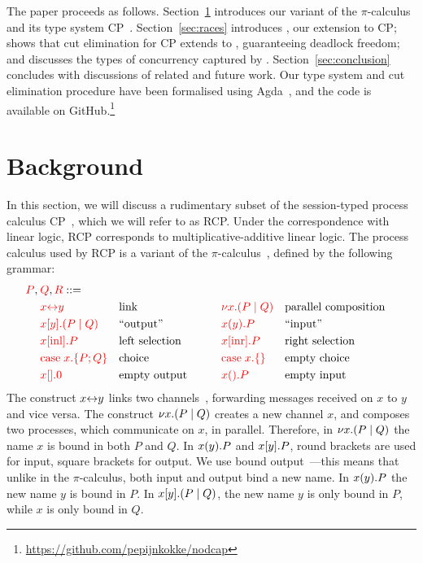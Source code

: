 \documentclass[a4paper,UKenglish]{lipics-v2016}
\begin{document}
The paper proceeds as follows.  Section~\ref{sec:background} introduces our
variant of the $\pi$-calculus and its type system CP~\cite{wadler2012}.
Section~\ref{sec:races} introduces \nodcap, our extension to CP; shows that cut
elimination for CP extends to \nodcap, guaranteeing deadlock freedom; and
discusses the types of concurrency captured by \nodcap.
Section~\ref{sec:conclusion} concludes with discussions of related and future work.
%
Our type system and cut elimination procedure
have been formalised using Agda~\cite{norell2009}, and the code is
available on GitHub.\footnote{%
  \url{https://github.com/pepijnkokke/nodcap}
}

\section{Background}
\label{sec:background}

In this section, we will discuss a rudimentary subset of the session-typed
process calculus CP~\cite{wadler2012}, which we will refer to as RCP.
Under the correspondence with linear logic, RCP corresponds to
multiplicative-additive linear logic.
The process calculus used by RCP is a variant of the
$\pi$-calculus~\cite{milner1992b}, defined by
the following grammar:
\[
  \begin{aligned}
    \red{P},\:&\red{Q},\red{R} ::=\\
    &       \red{\link{x}{y}}           &&\text{link}
    &\qquad&\red{\cut{x}(P \mid Q)}     &&\text{parallel composition}\\
    &       \red{\send{x}{y}(P \mid Q)} &&\text{``output''}
    &\qquad&\red{\recv{x}{y}P}          &&\text{``input''}\\
    &       \red{\inl{x}P}              &&\text{left selection}
    &\qquad&\red{\inr{x}P}              &&\text{right selection}\\
    &       \red{\case{x}{P}{Q}}        &&\text{choice}
    &\qquad&\red{\case{x}{}{}}          &&\text{empty choice}\\
    &       \red{\send{x}{}0}           &&\text{empty output}
    &\qquad&\red{\recv{x}{}P}           &&\text{empty input}\\
  \end{aligned}
\]
The construct ${x{\leftrightarrow}y}$ links two channels~\cite{sangiorgi1996,boreale1998},
forwarding messages received on $x$ to $y$ and vice versa.
%
The construct ${\nu x.}{(P \mid Q)}$ creates a new channel $x$, and composes two
processes, which communicate on $x$, in parallel.
Therefore, in ${\nu x.}{(P \mid Q)}$ the name $x$ is bound in both $P$ and $Q$.
%
In ${x(y).}P$ and ${x[y].}P$, round brackets are used for input, square
brackets for output.
We use bound output~\cite{sangiorgi1996}---this means that unlike in the
$\pi$-calculus, both input and output bind a new name.
In ${x(y).}P$ the new name $y$ is bound in $P$.
In ${x[y].}{(P \mid Q)}$, the new name $y$ is only bound in $P$, while $x$
is only bound in $Q$.
\end{document}

